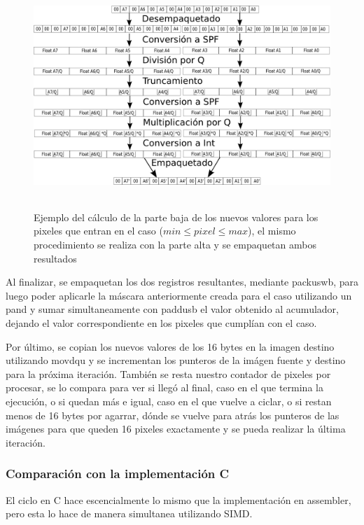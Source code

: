 \begin{figure}[H]
\centering
\includegraphics[width=150mm, height=85mm]{calcq.png}
\caption{Ejemplo del cálculo de la parte baja de los nuevos valores para los pixeles que entran en el caso ($min \leq pixel \leq max$), el mismo procedimiento se realiza con la parte alta y se empaquetan ambos resultados}
\label{overflow}
\end{figure}

Al finalizar, se empaquetan los dos registros resultantes, mediante packuswb, para luego poder aplicarle la máscara anteriormente creada para el caso utilizando un pand y sumar simultaneamente con paddusb el valor obtenido al acumulador, dejando el valor correspondiente en los pixeles que cumplían con el caso.

Por último, se copian los nuevos valores de los 16 bytes en la imagen destino utilizando movdqu y se incrementan los punteros de la imágen fuente y destino para la próxima iteración. También se resta nuestro contador de pixeles por procesar, se lo compara para ver si llegó al final, caso en el que termina la ejecución, o si quedan más e igual, caso en el que vuelve a ciclar, o si restan menos de 16 bytes por agarrar, dónde se vuelve para atrás los punteros de las imágenes para que queden 16 pixeles exactamente y se pueda realizar la última iteración.

\subsubsection{Comparación con la implementación C}
El ciclo en C hace escencialmente lo mismo que la implementación en assembler, pero esta lo hace de manera simultanea utilizando SIMD. 

